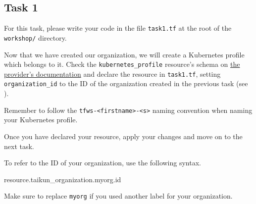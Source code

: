 \subsection{Task 1}\label{sec:task1}

\begin{note}
For this task, please write your code in the file \texttt{task1.tf}
at the root of the \texttt{workshop/} directory.
\end{note}

Now that we have created our organization,
we will create a Kubernetes profile which belongs to it.
Check the \texttt{kubernetes\_profile} resource's schema on
\href{https://intuinewin.github.io/taikun-docs/resources/kubernetes_profile.html}{the provider's documentation}
and declare the resource in \texttt{task1.tf}, setting \texttt{organization\_id} to the ID
of the organization created in the previous task (see ).

\begin{warn}
  Remember to follow the \texttt{tfws-<firstname>-<s>} naming convention when naming your Kubernetes profile.
\end{warn}

Once you have declared your resource, apply your changes and move on to the next task.

\begin{tip}
To refer to the ID of your organization, use the following syntax.
\begin{tf}
resource.taikun_organization.myorg.id
\end{tf}
Make sure to replace \texttt{myorg} if you used another label for your organization.
\end{tip}

